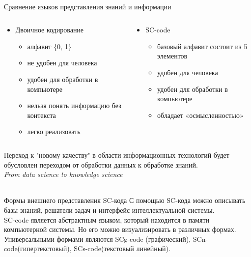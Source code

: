 \begin{frame}{\\Сравнение языков представления знаний и информации}
	\vspace{10mm}
	\begin{columns}[T,onlytextwidth]
		\begin{column}{0.5\textwidth}
			\begin{itemize}
				\item[] Двоичное кодирование
				\begin{itemize}
					\item алфавит \{0, 1\}
					\item не удобен для человека
					\item удобен для обработки в компьютере
					\item нельзя понять информацию без контекста
					\item легко реализовать
				\end{itemize}
			\end{itemize}
		\end{column}
		\begin{column}{0.5\textwidth}
			\begin{itemize}
				\item[] SC-code
				\begin{itemize}
					\item базовый алфавит состоит из 5 элементов
					\item удобен для человека
					\item удобен для обработки в компьютере
					\item обладает «осмысленностью»
				\end{itemize}
			\end{itemize}
		\end{column}
	\end{columns}
    \vspace{5mm}
	Переход к "новому качеству" в области информационных технологий будет обусловлен переходом от обработки данных к обработке знаний.
	\\ \textit{From data science to knowledge science}
\end{frame}

\begin{frame}{\\Формы внешнего представления SC-кода}
	\vspace{10mm}
	С помощью SC-кода можно описывать базы знаний, решатели задач и интерфейс интеллектуальной системы. \\ \vspace{5mm}
	SC-code является абстрактным языком, который находится в памяти компьютерной системы. Но его можно визуализировать в различных формах. \\ \vspace{5mm}
	Универсальными формами являются SCg-code (графический), SCn-code(гипертекстовый), SCs-code(текстовый линейный).
\end{frame}

